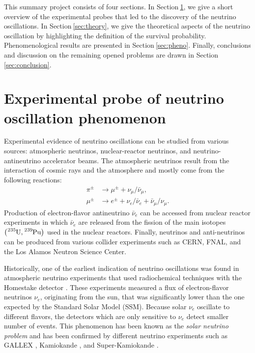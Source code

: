 \documentclass[twocolumn,secnumarabic,amssymb, nobibnotes, aps, prd,10pt]{revtex4-1}
\newcommand{\Sec}[1]{Section$\:$\ref{#1}}
\begin{document}
This summary project consists of four sections. In \Sec{sec:experiment}, we give a short
overview of the experimental probes that led to the discovery of the neutrino oscillations.
In \Sec{sec:theory}, we give the theoretical aspects of the neutrino oscillation by
highlighting the definition of the survival probability. Phenomenological results are presented
in \Sec{sec:pheno}. Finally, conclusions and discussion on the remaining opened problems are
drawn in \Sec{sec:conclusion}.


\section{Experimental probe of neutrino oscillation phenomenon}
\label{sec:experiment}

Experimental evidence of neutrino oscillations can be studied from various sources:
atmospheric neutrinos, nuclear-reactor neutrinos, and neutrino-antineutrino accelerator
beams. The atmospheric neutrinos result from the interaction of cosmic rays and the
atmosphere and mostly come from the following reactions:
\begin{align}
\pi^\pm  &\longrightarrow \mu^\pm + \nu_\mu / \bar{\nu}_\mu, \\
\mu^\pm  &\longrightarrow e^\pm + \nu_e / \bar{\nu}_e + \bar{\nu}_\mu / \nu_\mu .
\end{align}
Production of electron-flavor antineutrino $\bar{\nu}_e$ can be accessed from nuclear
reactor experiments in which $\bar{\nu}_e$ are released from the fission of the 
main isotopes $\left( \ce{^{235}U}, \ce{^{239}Pu} \right)$ used in the nuclear reactors.
Finally, neutrinos and anti-neutrinos can be produced from various collider experiments such as
CERN, FNAL, and the Los Alamos Neutron Science Center.

Historically, one of the earliest indication of neutrino oscillations was found in 
atmospheric neutrino experiments that used radiochemical techniques with the Homestake
detector \cite{Cleveland:1998nv}. These experiments measured a flux of electron-flavor 
neutrinos $\nu_e$, originating from the sun, that was significantly lower than the 
one expected by the Standard Solar Model (SSM). Because solar $\nu_e$ oscillate to 
different flavors, the detectors which are only sensitive to $\nu_e$ detect smaller 
number of events. This phenomenon has been known as the \emph{solar neutrino problem} 
and has been confirmed by different neutrino experiments such as GALLEX 
\cite{Hampel:1996qd, Anselmann:1993mh}, Kamiokande \cite{Hirata:1988ad, Hirata:1991ub, 
Fukuda:1996sz}, and Super-Kamiokande \cite{Fukuda:1998fd, Giunti:1999qm}.
\end{document}
